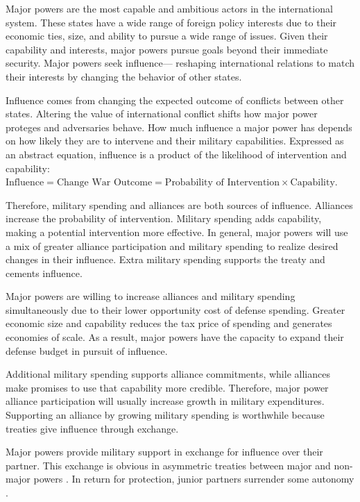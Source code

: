\documentclass[12pt]{article}
\begin{document}
Major powers are the most capable and ambitious actors in the international system. 
These states have a wide range of foreign policy interests due to their economic ties, size, and ability to pursue a wide range of issues. 
Given their capability and interests, major powers pursue goals beyond their immediate security. 
Major powers seek influence--- reshaping international relations to match their interests by changing the behavior of other states. 


Influence comes from changing the expected outcome of conflicts between other states.
Altering the value of international conflict shifts how major power proteges and adversaries behave.  
How much influence a major power has depends on how likely they are to intervene and their military capabilities. 
Expressed as an abstract equation, influence is a product of the likelihood of intervention and capability: $\mbox{Influence} = \mbox{Change War Outcome} = \mbox{Probability of Intervention} \times \mbox{Capability}$.


Therefore, military spending and alliances are both sources of influence. 
Alliances increase the probability of intervention. 
Military spending adds capability, making a potential intervention more effective. 
In general, major powers will use a mix of greater alliance participation and military spending to realize desired changes in their influence.
Extra military spending supports the treaty and cements influence.  


Major powers are willing to increase alliances and military spending simultaneously due to their lower opportunity cost of defense spending. 
Greater economic size and capability reduces the tax price of spending and generates economies of scale. 
As a result, major powers have the capacity to expand their defense budget in pursuit of influence.  


Additional military spending supports alliance commitments, while alliances make promises to use that capability more credible. 
Therefore, major power alliance participation will usually increase growth in military expenditures. 
Supporting an alliance by growing military spending is worthwhile because treaties give influence through exchange. 


Major powers provide military support in exchange for influence over their partner. 
This exchange is obvious in asymmetric treaties between major and non-major powers \citep{Morrow1991}. 
In return for protection, junior partners surrender some autonomy \citep{Lake2009}. 
\end{document}
